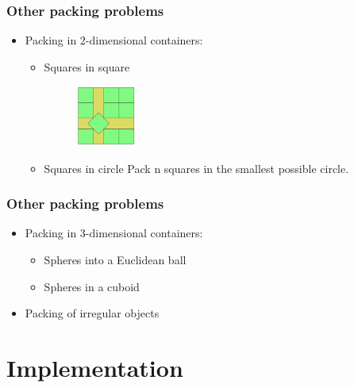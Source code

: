 \documentclass[slidestop,compress,mathserif,brown]{beamer}
\begin{document}
\begin{CJK}{UTF8}{kai}
\begin{frame}
\frametitle{Other packing problems}
\begin{itemize}
	\item Packing in 2-dimensional containers:
	\begin{itemize}
		\item Squares in square

		\begin{figure}
			\begin{center}
			\includegraphics[height = 2cm]{figures/squinsqu.png}
			\end{center}
		\end{figure}

		\item Squares in circle
		\newline
		Pack n squares in the smallest possible circle.
	\end{itemize}
\end{itemize}
\end{frame}

\begin{frame}
\frametitle{Other packing problems}
\begin{itemize}
	\item Packing in 3-dimensional containers:
 	\begin{itemize}
 		\item Spheres into a Euclidean ball
		\item Spheres in a cuboid
 	\end{itemize}
	\item Packing of irregular objects
\end{itemize}
\end{frame}

\section{Implementation}

\end{CJK}
\end{document}
